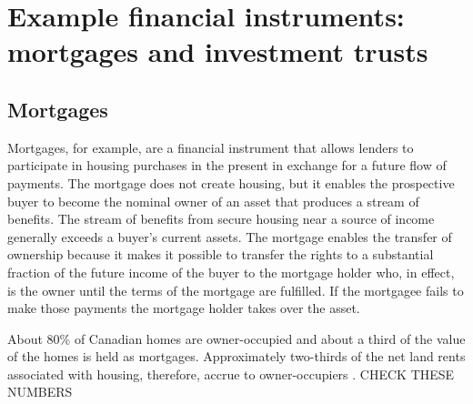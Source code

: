 \section{Example financial instruments: mortgages and investment trusts}

\subsection{Mortgages}

Mortgages, for example, are a financial instrument that allows lenders to  participate in housing purchases in the present in exchange for a future flow of payments.  The mortgage does not create housing, but it enables the prospective buyer to become the nominal owner of an asset that produces a stream of benefits. The stream of benefits from secure housing near a source of income generally exceeds a buyer's current assets. The mortgage enables the  transfer of ownership because it makes it possible to transfer the rights to a substantial fraction of the future income of the buyer to the mortgage holder who, in effect, is the owner until the terms of the mortgage are fulfilled.  If the mortgagee fails to make those payments the mortgage holder takes over the asset. 

About 80\% of Canadian homes are owner-occupied and about a third of the value of the homes is held as mortgages. Approximately two-thirds of the net land rents associated with housing, therefore, accrue to owner-occupiers \cite{CanadasHomes80percentowneroccuplied-1-3rd-mortgaged}. {\color {red}CHECK THESE NUMBERS } 


\begin{center}
\end{center}

